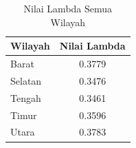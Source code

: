 \begin{table}[H]
    \centering
    \caption{Nilai Lambda Semua Wilayah}
    \label{table:nilai-lambda-semua-wilayah}
    \begin{tabular}{l c}
        \toprule
        \textbf{Wilayah} & \textbf{Nilai Lambda} \\
        \midrule
        Barat   & 0.3779 \\
        Selatan & 0.3476 \\
        Tengah  & 0.3461 \\
        Timur   & 0.3596 \\
        Utara   & 0.3783 \\
        \bottomrule
    \end{tabular}
\end{table}